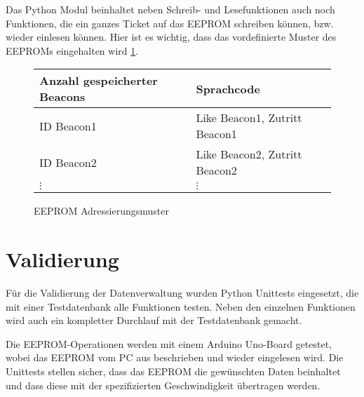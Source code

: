 Das Python Modul beinhaltet neben Schreib- und Lesefunktionen auch noch Funktionen, die ein ganzes Ticket auf das EEPROM schreiben können, bzw. wieder einlesen können.
Hier ist es wichtig, dass das vordefinierte Muster des EEPROMs eingehalten wird \ref{eeprom_memory_pattern}.


\begin{figure}
	\begin{tabular}{l|l}
		Anzahl gespeicherter Beacons & Sprachcode    \\ \hline
		ID Beacon1 & Like Beacon1, Zutritt Beacon1   \\ \hline
		ID Beacon2 & Like Beacon2, Zutritt Beacon2   \\ \hline
		\(\vdots\) & \(\vdots\) 
	\end{tabular}
	\caption{EEPROM Adressierungsmuster}
	\label{eeprom_memory_pattern}
\end{figure}

\section{Validierung}
Für die Validierung der Datenverwaltung wurden Python Unittests eingesetzt, die mit einer Testdatenbank alle Funktionen testen.
Neben den einzelnen Funktionen wird auch ein kompletter Durchlauf mit der Testdatenbank gemacht.

Die EEPROM-Operationen werden mit einem Arduino Uno-Board getestet, wobei das EEPROM vom PC aus beschrieben und wieder eingelesen wird.
Die Unittests stellen sicher, dass das EEPROM die gewünschten Daten beinhaltet und dass diese mit der spezifizierten Geschwindigkeit übertragen werden.


